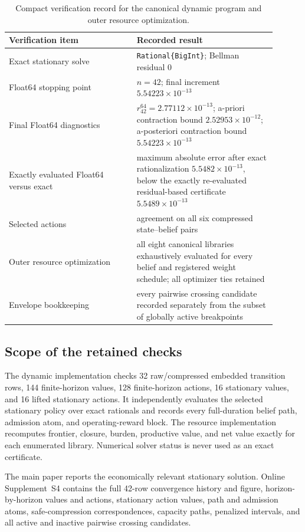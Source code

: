 \begin{table}[htbp]
\centering
\small
\begin{tabular}{@{}p{0.43\linewidth}p{0.47\linewidth}@{}}
\toprule
Verification item & Recorded result \\
\midrule
Exact stationary solve & \texttt{Rational\{BigInt\}}; Bellman residual \(0\) \\
Float64 stopping point & \(n=42\); final increment \(5.54223\times10^{-13}\) \\
Final Float64 diagnostics & \(r_{42}^{64}=2.77112\times10^{-13}\); a-priori
contraction bound \(2.52953\times10^{-12}\); a-posteriori contraction bound
\(5.54223\times10^{-13}\) \\
Exactly evaluated Float64 versus exact & maximum absolute error after exact
rationalization \(5.5482\times10^{-13}\), below the exactly re-evaluated
residual-based certificate
\(5.5489\times10^{-13}\) \\
Selected actions & agreement on all six compressed state--belief pairs \\
Outer resource optimization & all eight canonical libraries exhaustively
evaluated for every belief and registered weight schedule; all optimizer ties
retained \\
Envelope bookkeeping & every pairwise crossing candidate recorded separately
from the subset of globally active breakpoints \\
\bottomrule
\end{tabular}
\caption{Compact verification record for the canonical dynamic program and
outer resource optimization.}
\label{tab:canonical-verification-record}
\end{table}

\subsection{Scope of the retained checks}

The dynamic implementation checks 32 raw/compressed embedded transition rows,
144 finite-horizon values, 128 finite-horizon actions, 16 stationary values,
and 16 lifted stationary actions.  It independently evaluates the selected
stationary policy over exact rationals and records every full-duration belief
path, admission atom, and operating-reward block.  The resource implementation
recomputes frontier, closure, burden, productive value, and net value exactly
for each enumerated library.  Numerical solver status is never used as an
exact certificate.

The main paper reports the economically relevant stationary solution.  Online
Supplement~S4 contains the full 42-row convergence history and figure,
horizon-by-horizon values and actions, stationary action values, path and
admission atoms, safe-compression correspondences, capacity paths, penalized
intervals, and all active and inactive pairwise crossing candidates.
